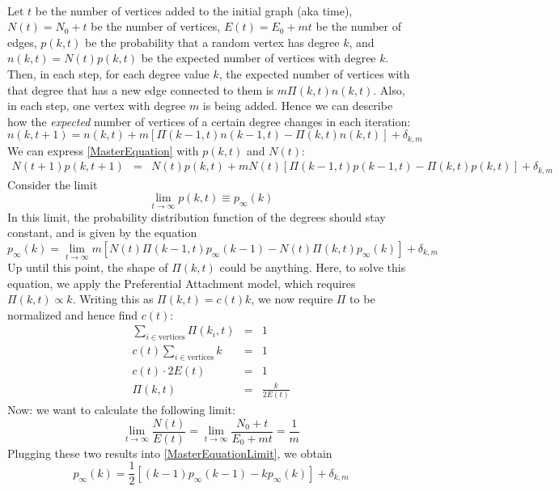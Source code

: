 \documentclass[a4paper,12pt]{article}
\begin{document}
\hfill\\
Let $t$ be the number of vertices added to the initial graph (aka time), $N(t)=N_0+t$ be the number of vertices, $E(t)=E_0 + mt$ be the number of edges, $p(k, t)$ be the probability that a random vertex has degree $k$, and $n(k, t)=N(t)p(k,t)$ be the expected number of vertices with degree $k$. Then, in each step, for each degree value $k$, the expected number of vertices with that degree that has a new edge connected to them is $m\Pi(k,t)n(k,t)$. Also, in each step, one vertex with degree $m$ is being added. Hence we can describe how the \textit{expected} number of vertices of a certain degree changes in each iteration:
\begin{equation} \label{MasterEquation}
n(k, t+1) = n(k, t) + m \left[\Pi(k-1,t)n(k-1,t) - \Pi(k,t)n(k,t)\right] + \delta_{k,m}
\end{equation}
We can express \ref{MasterEquation} with $p(k,t)$ and $N(t)$:
\begin{eqnarray*}
N(t+1)p(k, t+1) &=& N(t)p(k, t) + mN(t) \left[\Pi(k-1,t)p(k-1,t) - \Pi(k,t)p(k,t)\right] + \delta_{k,m}
\end{eqnarray*}
Consider the limit
$$\lim_{t\to\infty} p(k,t)\equiv p_\infty (k)$$
In this limit, the probability distribution function of the degrees should stay constant, and is given by the equation
\begin{equation} \label{MasterEquationLimit}
p_\infty(k) = \lim_{t\to\infty} m \left[N(t)\Pi(k-1,t)p_\infty(k-1) - N(t)\Pi(k,t)p_\infty(k)\right] + \delta_{k,m}
\end{equation}
Up until this point, the shape of $\Pi(k,t)$ could be anything. Here, to solve this equation, we apply the Preferential Attachment model, which requires $\Pi(k,t)\propto k$. Writing this as $\Pi(k,t)=c(t)k$, we now require $\Pi$ to be normalized and hence find $c(t)$:
\begin{eqnarray*}
\sum_{i\in\mathrm{vertices}} \Pi(k_i,t)&=&1\\
c(t) \sum_{i\in\mathrm{vertices}} k&=&1\\
c(t) \cdot 2E(t)&=&1\\
\Pi(k,t) &=& \frac{k}{2E(t)}
\end{eqnarray*}
Now: we want to calculate the following limit:
$$\lim_{t\to\infty}\frac{N(t)}{E(t)}=\lim_{t\to\infty}\frac{N_0+t}{E_0+mt}=\frac{1}{m}$$
Plugging these two results into \ref{MasterEquationLimit}, we obtain
\begin{equation} \label{MasterEquationLimitPA}
p_\infty(k) = \frac{1}{2}\left[(k-1)p_\infty(k-1) - kp_\infty(k)\right] + \delta_{k,m}
\end{equation}
\end{document}
